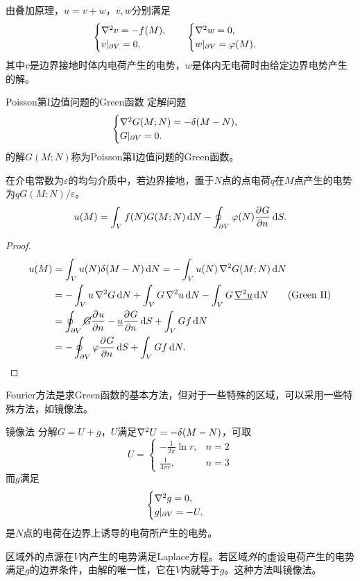 由叠加原理，$u = v + w$，$v,w$分别满足
\begin{align*}
	\begin{cases}
		\nabla^2 v = -f(M),\\
		{v}\rvert_{\partial V} = 0,
	\end{cases}\quad
	\begin{cases}
		\nabla^2 w = 0,\\
		{w}\rvert_{\partial V} = \varphi(M),
	\end{cases}
\end{align*}
其中$v$是边界接地时体内电荷产生的电势，$w$是体内无电荷时由给定边界电势产生的解。
\begin{definition}{Poisson第I边值问题的Green函数}{}
	定解问题
	\begin{align}
		\begin{cases}
			\nabla^2 G(M;N) = -\delta(M - N),\\
			{G}\rvert_{\partial V} = 0.
		\end{cases}
	\end{align}
	的解$G(M;N)$称为Poisson第I边值问题的Green函数。
\end{definition}
在介电常数为$\varepsilon$的均匀介质中，若边界接地，置于$N$点的点电荷$q$在$M$点产生的电势为$qG(M;N)/\varepsilon$。
\begin{align}
	u(M) = \int_Vf(N)G(M;N)\mathop{}\!\mathrm{d} N - \oint_{\partial V}\varphi(N)\frac{\partial^{}G}{\partial{n}^{}}\mathop{}\!\mathrm{d} S.
\end{align}
\begin{proof}
	\begin{align*}
		u(M) &= \int_Vu(N)\delta(M - N)\d N = -\int_Vu(N)\,\laplacian G(M;N)\d N\\
		&= -\int_V u\,\laplacian G\d N + \int_VG\,\laplacian u\d N - \int_VG\,\underline{\laplacian u}\d N\tag{Green II}\\
		&= \oint_{\p V}\cancel{G}\pv un - \underline{u}\pv Gn\d S + \int_VG f\d N\\
		&= -\oint_{\p V}\varphi\pv Gn\d S + \int_VGf\d N.
	\end{align*}
\end{proof}
Fourier方法是求Green函数的基本方法，但对于一些特殊的区域，可以采用一些特殊方法，如镜像法。
\begin{method}{镜像法}{}
	分解$G = U + g$，$U$满足$\nabla^2 U = -\delta(M - N)$，可取
	\begin{equation}
		\label{eq:mmp-free-laplace-kernels}
		U = \begin{cases}
			-\frac1{2\pi}\ln r,&n = 2\\[1ex]
			\frac1{4\pi r},&n = 3
		\end{cases}
	\end{equation}
	而$g$满足 
	\[
		\begin{cases}
			\nabla^2 g = 0,\\
			{g}\rvert_{\partial V} = -U,
		\end{cases}
	\]
	是$N$点的电荷在边界上诱导的电荷所产生的电势。
	
	区域外的点源在$V$内产生的电势满足Laplace方程。若区域\emph{外}的虚设电荷产生的电势满足$g$的边界条件，由解的唯一性，它在$V$内就等于$g$。这种方法叫镜像法。%
\end{method}
